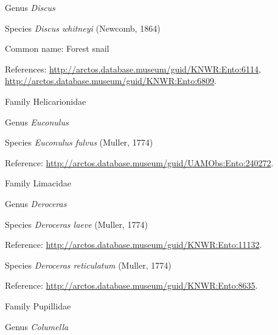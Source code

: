 \documentclass[9pt, article]{memoir}
\begin{document}
\begin{multicols}{2}
\vspace{6pt}\noindent\hspace{30pt}Genus \textit{Discus}


\vspace{6pt}\noindent\hspace{36pt}Species \textit{Discus whitneyi} (Newcomb, 1864)


Common name: Forest snail

References: 
\url{http://arctos.database.museum/guid/KNWR:Ento:6114}, 
\url{http://arctos.database.museum/guid/KNWR:Ento:6809}.

\vspace{6pt}\noindent\hspace{24pt}Family Helicarionidae


\vspace{6pt}\noindent\hspace{30pt}Genus \textit{Euconulus}


\vspace{6pt}\noindent\hspace{36pt}Species \textit{Euconulus fulvus} (Muller, 1774)


Reference: 
\url{http://arctos.database.museum/guid/UAMObs:Ento:240272}.

\vspace{6pt}\noindent\hspace{24pt}Family Limacidae


\vspace{6pt}\noindent\hspace{30pt}Genus \textit{Deroceras}


\vspace{6pt}\noindent\hspace{36pt}Species \textit{Deroceras laeve} (Muller, 1774)


Reference: 
\url{http://arctos.database.museum/guid/KNWR:Ento:11132}.

\vspace{6pt}\noindent\hspace{36pt}Species \textit{Deroceras reticulatum} (Muller, 1774)


Reference: 
\url{http://arctos.database.museum/guid/KNWR:Ento:8635}.

\vspace{6pt}\noindent\hspace{24pt}Family Pupillidae


\vspace{6pt}\noindent\hspace{30pt}Genus \textit{Columella}



\end{multicols}
\end{document}
